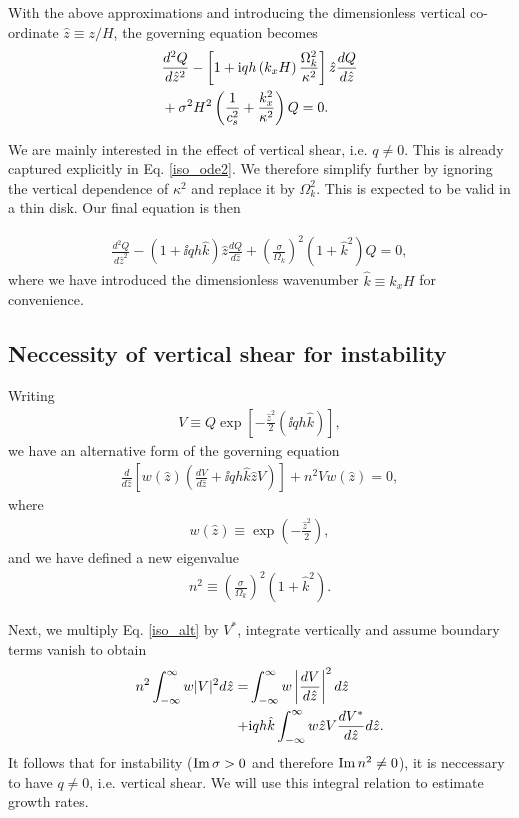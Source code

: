 With the above approximations and introducing the dimensionless
vertical co-ordinate $\hat{z} \equiv z/H$, the governing equation becomes
\begin{align}\label{iso_ode2}
  &\frac{d^2Q}{d\hat{z}^2} - \left[ 1 + \mathrm{i} qh
    \left(k_xH\right)\frac{\Omega_k^2}{\kappa^2}\right]\hat{z}\frac{dQ}{d\hat{z}}\notag\\
  &+ \sigma^2H^2\left(\frac{1}{c_s^2}+\frac{k_x^2}{\kappa^2}\right)Q =
  0. 
\end{align}

We are mainly interested in the effect of vertical shear, i.e. $q\neq
0$. This is already captured explicitly in Eq. \ref{iso_ode2}. We 
therefore simplify further by ignoring the vertical dependence of
$\kappa^2$ and replace it by $\Omega_k^2$. This is expected to be
valid in a thin disk. Our final equation is then

\begin{align}\label{iso_ode3}
  \frac{d^2Q}{d\hat{z}^2} - \left(1 + \ii qh
    \hat{k}\right)\hat{z}\frac{dQ}{d\hat{z}} +
  \left(\frac{\sigma}{\Omega_k}\right)^2\left(1+\hat{k}^2\right)Q = 
  0, 
\end{align}
where we have introduced the dimensionless wavenumber $\hat{k}
\equiv k_x H$ for convenience. 

\subsection{Neccessity of vertical shear for instability}
Writing
\begin{align}
  V \equiv Q\exp{\left[-\frac{\hat{z}^2}{2}(\ii q h
      \hat{k})\right]},
\end{align}
we have an alternative form of the governing equation 
\begin{align}\label{iso_alt}
  \frac{d}{d\hat{z}}\left[w(\hat{z})\left(\frac{dV}{d\hat{z}} + \ii q h
    \hat{k}\hat{z}V\right)\right] + n^2V w(\hat{z}) =0, 
\end{align}
where 
\begin{align}
  w(\hat{z}) \equiv \exp{\left(-\frac{\hat{z}^2}{2}\right)},  
\end{align}
and we have defined a new eigenvalue
\begin{align}
  n^2 \equiv \left(\frac{\sigma}{\Omega_k}\right)^2(1+\hat{k}^2). 
\end{align}

Next, we multiply Eq. \ref{iso_alt} by $V^{*}$, integrate
vertically and assume boundary terms vanish to obtain
\begin{align}\label{integral_relation}
  n^2\int_{-\infty}^{\infty}w|V|^2d\hat{z} 
  =&\int_{-\infty}^{\infty}w\left|\frac{dV}{d\hat{z}}\right|^2d\hat{z}\notag\\
  +&\mathrm{i} q h \hat{k}\int_{-\infty}^{\infty}w\hat{z}V\frac{dV^*}{d\hat{z}}d\hat{z}.   
\end{align}
It follows that for instability ($\operatorname{Im}\sigma>0$ and therefore $\operatorname{Im}
n^2 \neq 0$), it is neccessary to have $q\neq 0$, i.e. vertical
shear. We will use this integral relation to estimate growth
rates. 


